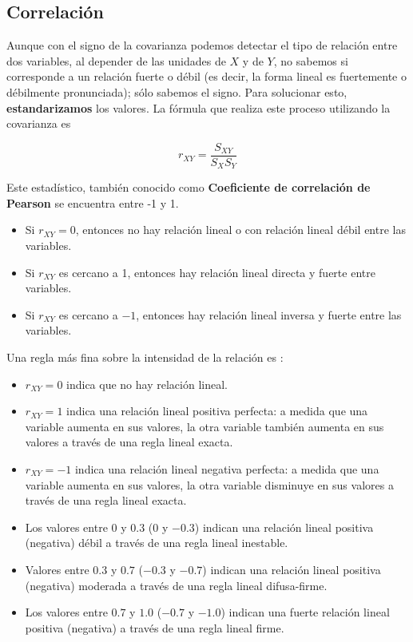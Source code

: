\documentclass[
  11pt,
]{book}
\providecommand{\tightlist}{%
  \setlength{\itemsep}{0pt}\setlength{\parskip}{0pt}}
\theoremstyle{definition}
\theoremstyle{definition}
\theoremstyle{definition}
\theoremstyle{definition}
\theoremstyle{remark}
\begin{document}
\subsection{Correlación}\label{regresion-lineal-correlacion}

Aunque con el signo de la covarianza podemos detectar el tipo de relación entre dos variables, al depender de las unidades de \(X\) y de \(Y\), no sabemos si corresponde a un relación fuerte o débil (es decir, la forma lineal es fuertemente o débilmente pronunciada); sólo sabemos el signo. Para solucionar esto, \textbf{estandarizamos} los valores. La fórmula que realiza este proceso utilizando la covarianza es

\begin{equation}
r_{XY} = \frac{S_{XY}}{S_{X}S_{Y}}
\label{eq:Correlacion}
\end{equation}

Este estadístico, también conocido como \textbf{Coeficiente de correlación de Pearson} se encuentra entre -1 y 1.

\begin{itemize}
\item
  Si \(r_{XY} = 0\), entonces no hay relación lineal o con relación lineal débil entre las variables.
\item
  Si \(r_{XY}\) es cercano a 1, entonces hay relación lineal directa y fuerte entre variables.
\item
  Si \(r_{XY}\) es cercano a \(-1\), entonces hay relación lineal inversa y fuerte entre las variables.
\end{itemize}

Una regla más fina sobre la intensidad de la relación es \citep{ratner_correlation_2009}:

\begin{itemize}
\tightlist
\item
  \(r_{XY} = 0\) indica que no hay relación lineal.
\item
  \(r_{XY} = 1\) indica una relación lineal positiva perfecta: a medida que una variable aumenta en sus valores, la otra variable también aumenta en sus valores a través de una regla lineal exacta.
\item
  \(r_{XY} = -1\) indica una relación lineal negativa perfecta: a medida que una variable aumenta en sus valores, la otra variable disminuye en sus valores a través de una regla lineal exacta.
\item
  Los valores entre \(0\) y \(0.3\) (\(0\) y \(−0.3\)) indican una relación lineal positiva (negativa) débil a través de una regla lineal inestable.
\item
  Valores entre \(0.3\) y \(0.7\) (\(-0.3\) y \(−0.7\)) indican una relación lineal positiva (negativa) moderada a través de una regla lineal difusa-firme.
\item
  Los valores entre \(0.7\) y \(1.0\) (\(−0.7\) y \(−1.0\)) indican una fuerte relación lineal positiva (negativa) a través de una regla lineal firme.
\end{itemize}
\end{document}
